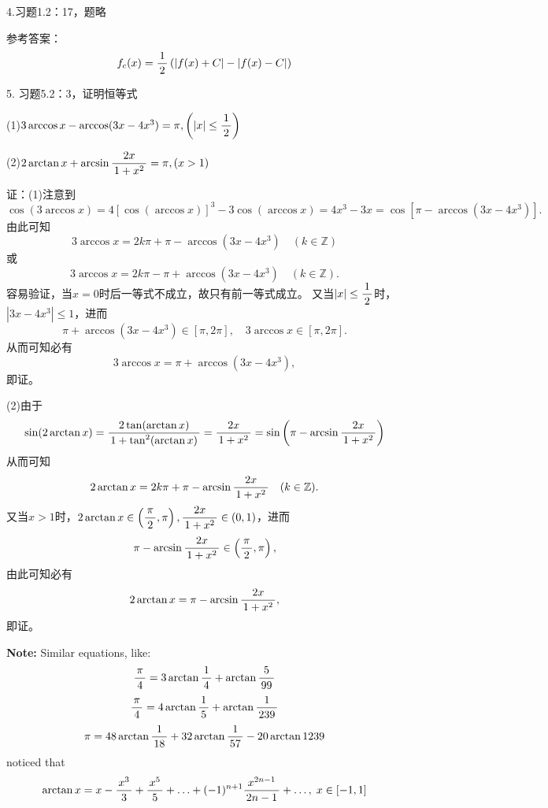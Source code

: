 \bigskip

4.习题1.2：17，题略

参考答案：
$$f_c(x)=\df12\left(|f(x)+C|-|f(x)-C|\right)$$

\bigskip

5. 习题5.2：3，证明恒等式

(1)$3\arccos x-\arccos(3x-4x^3)=\pi,\left(|x|\leq\df12\right)$

(2)$2\arctan x+\arcsin\df{2x}{1+x^2}=\pi,(x>1)$

证：(1)注意到
$$\cos(3\arccos x)=4[\cos(\arccos x)]^3-3\cos(\arccos
x)=4x^3-3x=\cos[\pi-\arccos(3x-4x^3)].$$
由此可知
$$3\arccos x=2k\pi+\pi-\arccos(3x-4x^3)\quad(k\in\mathbb{Z})$$
或
$$3\arccos x=2k\pi-\pi+\arccos(3x-4x^3)\quad(k\in\mathbb{Z}).$$
容易验证，当$x=0$时后一等式不成立，故只有前一等式成立。
又当$|x|\leq\df12$时，$|3x-4x^3|\leq 1$，进而
$$\pi+\arccos(3x-4x^3)\in[\pi,2\pi],\quad 3\arccos x\in[\pi,2\pi].$$
从而可知必有
$$3\arccos x=\pi+\arccos(3x-4x^3),$$
即证。

(2)由于
$$\sin(2\arctan x)=\df{2\tan(\arctan x)}{1+\tan^2(\arctan
x)}=\df{2x}{1+x^2}=\sin\left(\pi-\arcsin\df{2x}{1+x^2}\right)$$
从而可知
$$2\arctan x=2k\pi+\pi-\arcsin\df{2x}{1+x^2}\quad(k\in\mathbb{Z}).$$
又当$x>1$时，$2\arctan x\in\left(\df{\pi}2,\pi\right),\df{2x}{1+x^2}\in(0,1)$，进而
$$\pi-\arcsin\df{2x}{1+x^2}\in\left(\df{\pi}2,\pi\right),$$
由此可知必有
$$2\arctan x=\pi-\arcsin\df{2x}{1+x^2},$$
即证。

{\bf Note:} Similar equations, like:
$$\df{\pi}4=3\arctan\df14+\arctan\df5{99}$$ 
$$\df{\pi}4=4\arctan\df15+\arctan\df1{239}$$
$$\pi=48\arctan\df1{18}+32\arctan\df1{57}-20\arctan1{239}$$  
noticed that
$$\arctan x=x-\df{x^3}3+\df{x^5}5+\ldots+(-1)^{n+1}\df{x^{2n-1}}{2n-1}
+\ldots,\;x\in[-1,1]$$